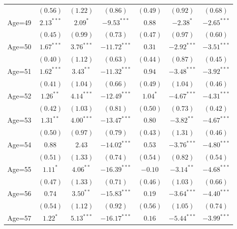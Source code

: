 \documentclass[fullpage]{paper}
\begin{document}
\begin{center}
\begin{longtable}{l c c c c c c }
            & $(0.56)$      & $(1.22)$      & $(0.86)$       & $(0.49)$      & $(0.92)$      & $(0.68)$      \\
Age=49      & $2.13^{***}$  & $2.09^{*}$    & $-9.53^{***}$  & $0.88$        & $-2.38^{*}$   & $-2.65^{***}$ \\
            & $(0.45)$      & $(0.99)$      & $(0.73)$       & $(0.47)$      & $(0.97)$      & $(0.60)$      \\
Age=50      & $1.67^{***}$  & $3.76^{***}$  & $-11.72^{***}$ & $0.31$        & $-2.92^{***}$ & $-3.51^{***}$ \\
            & $(0.40)$      & $(1.12)$      & $(0.63)$       & $(0.44)$      & $(0.87)$      & $(0.45)$      \\
Age=51      & $1.62^{***}$  & $3.43^{**}$   & $-11.32^{***}$ & $0.94$        & $-3.48^{***}$ & $-3.92^{***}$ \\
            & $(0.41)$      & $(1.04)$      & $(0.66)$       & $(0.49)$      & $(1.04)$      & $(0.46)$      \\
Age=52      & $1.26^{**}$   & $4.14^{***}$  & $-12.49^{***}$ & $1.04^{*}$    & $-4.67^{***}$ & $-4.31^{***}$ \\
            & $(0.42)$      & $(1.03)$      & $(0.81)$       & $(0.50)$      & $(0.73)$      & $(0.42)$      \\
Age=53      & $1.31^{**}$   & $4.00^{***}$  & $-13.47^{***}$ & $0.80$        & $-3.82^{**}$  & $-4.67^{***}$ \\
            & $(0.50)$      & $(0.97)$      & $(0.79)$       & $(0.43)$      & $(1.31)$      & $(0.46)$      \\
Age=54      & $0.88$        & $2.43$        & $-14.02^{***}$ & $0.53$        & $-3.76^{***}$ & $-4.80^{***}$ \\
            & $(0.51)$      & $(1.33)$      & $(0.74)$       & $(0.54)$      & $(0.82)$      & $(0.54)$      \\
Age=55      & $1.11^{*}$    & $4.06^{**}$   & $-16.39^{***}$ & $-0.10$       & $-3.14^{**}$  & $-4.68^{***}$ \\
            & $(0.47)$      & $(1.33)$      & $(0.71)$       & $(0.46)$      & $(1.03)$      & $(0.66)$      \\
Age=56      & $0.74$        & $3.50^{**}$   & $-15.83^{***}$ & $0.19$        & $-3.64^{***}$ & $-4.40^{***}$ \\
            & $(0.54)$      & $(1.12)$      & $(0.92)$       & $(0.56)$      & $(1.05)$      & $(0.74)$      \\
Age=57      & $1.22^{*}$    & $5.13^{***}$  & $-16.17^{***}$ & $0.16$        & $-5.44^{***}$ & $-3.99^{***}$ \\

\end{longtable}
\end{center}
\end{document}
